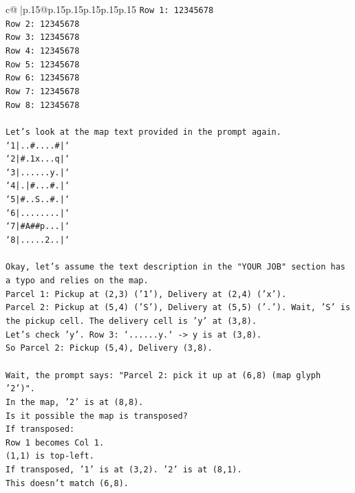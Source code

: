 \documentclass{article}
\begin{document}
{\begin{supertabular}{c@{$\;$}|p{.15\linewidth}@{}p{.15\linewidth}p{.15\linewidth}p{.15\linewidth}p{.15\linewidth}p{.15\linewidth}}
{{{\texttt{Row 1: 12345678} \\
\texttt{Row 2: 12345678} \\
\texttt{Row 3: 12345678} \\
\texttt{Row 4: 12345678} \\
\texttt{Row 5: 12345678} \\
\texttt{Row 6: 12345678} \\
\texttt{Row 7: 12345678} \\
\texttt{Row 8: 12345678} \\
\\ 
\texttt{Let's look at the map text provided in the prompt again.} \\
\texttt{`1|..\#....\#|`} \\
\texttt{`2|\#.1x...q|`} \\
\texttt{`3|......y.|`} \\
\texttt{`4|.|\#...\#.|`} \\
\texttt{`5|\#..S..\#.|`} \\
\texttt{`6|........|`} \\
\texttt{`7|\#A\#\#p...|`} \\
\texttt{`8|.....2..|`} \\
\\ 
\texttt{Okay, let's assume the text description in the "YOUR JOB" section has a typo and relies on the map.} \\
\texttt{Parcel 1: Pickup at (2,3) ('1'), Delivery at (2,4) ('x').} \\
\texttt{Parcel 2: Pickup at (5,4) ('S'), Delivery at (5,5) ('.'). Wait, 'S' is the pickup cell. The delivery cell is 'y' at (3,8).} \\
\texttt{Let's check 'y'. Row 3: `......y.` {-}> y is at (3,8).} \\
\texttt{So Parcel 2: Pickup (5,4), Delivery (3,8).} \\
\\ 
\texttt{Wait, the prompt says: "Parcel 2: pick it up at (6,8) (map glyph '2')".} \\
\texttt{In the map, '2' is at (8,8).} \\
\texttt{Is it possible the map is transposed?} \\
\texttt{If transposed:} \\
\texttt{Row 1 becomes Col 1.} \\
\texttt{(1,1) is top{-}left.} \\
\texttt{If transposed, '1' is at (3,2). '2' is at (8,1).} \\
\texttt{This doesn't match (6,8).} \\
}}}
\end{supertabular}}
\end{document}
